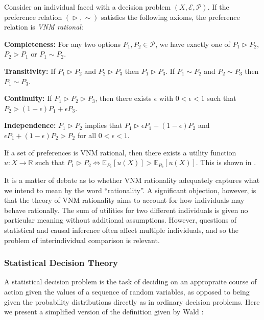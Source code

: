 \begin{definition}
Consider an individual faced with a decision problem $(X,\mathcal{E},\mathcal{P})$. If the preference relation $(\vartriangleright, \sim)$ satisfies the following axioms, the preference relation is \emph{VNM rational}:

\textbf{Completeness:} For any two options $P_1,P_2\in \mathcal{P}$, we have exactly one of $P_1\vartriangleright P_2$, $P_2\vartriangleright P_1$ or $P_1 \sim P_2$.

\textbf{Transitivity:} If $P_1\vartriangleright P_2$ and $P_2\vartriangleright P_3$ then $P_1\vartriangleright P_3$. If $P_1\sim P_2$ and $P_2\sim P_3$ then $P_1\sim P_3$.

\textbf{Continuity:} If $P_1\vartriangleright P_2 \vartriangleright P_3$, then there exists $\epsilon$ with $0<\epsilon<1$ such that $P_2 \vartriangleright (1-\epsilon) P_1 + \epsilon P_3$.

\textbf{Independence:} $P_1 \vartriangleright P_2$ implies that $P_1 \vartriangleright \epsilon P_1 + (1-\epsilon) P_2$ and $\epsilon P_1 + (1-\epsilon)P_2 \vartriangleright P_2$ for all $0<\epsilon<1$.
\end{definition}

If a set of preferences is VNM rational, then there exists a utility function $u:X\to \mathbb{R}$ such that $P_1\vartriangleright P_2 \Leftrightarrow \mathbb{E}_{P_1}[u(X)] > \mathbb{E}_{P_2}[u(X)]$. This is shown in \cite{von_neumann_theory_1944}.

It is a matter of debate as to whether VNM rationality adequately captures what we intend to mean by the word ``rationality''\cite{schoemaker_expected_1982}. A significant objection, however, is that the theory of VNM rationality aims to account for how individuals may behave rationally. The sum of utilities for two different individuals is given no particular meaning without additional assumptions. However, questions of statistical and causal inference often affect multiple individuals, and so the problem of interindividual comparison is relevant\cite{von_neumann_theory_1944,savage_theory_1951}.

\subsubsection{Statistical Decision Theory}

A statistical decision problem is the task of deciding on an appropraite course of action given the values of a sequence of random variables, as opposed to being given the probability distributions directly as in ordinary decision problems. Here we present a simplified version of the definition given by Wald \cite{wald1950statistical}:

